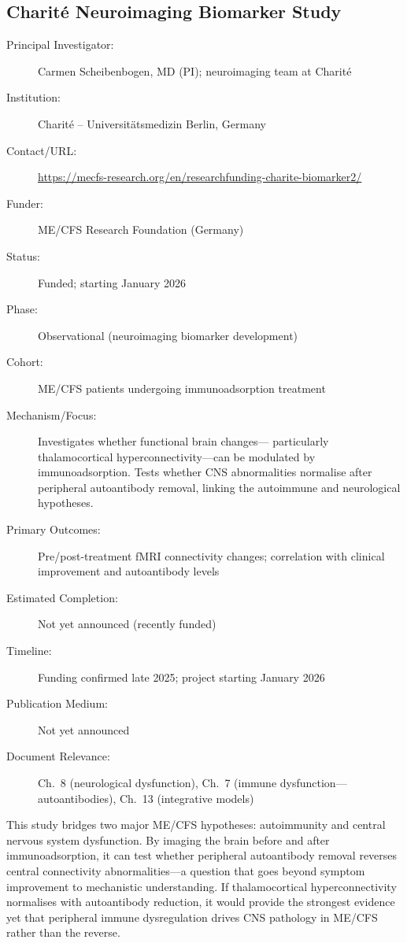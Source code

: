 \subsection{Charit\'{e} Neuroimaging Biomarker Study}
\label{sec:registry-charite-neuroimaging}

\begin{description}
    \item[Principal Investigator:] Carmen Scheibenbogen, MD (PI);
        neuroimaging team at Charit\'{e}
    \item[Institution:] Charit\'{e} -- Universit\"{a}tsmedizin Berlin, Germany
    \item[Contact/URL:] \url{https://mecfs-research.org/en/researchfunding-charite-biomarker2/}
    \item[Funder:] ME/CFS Research Foundation (Germany)
    \item[Status:] Funded; starting January 2026
    \item[Phase:] Observational (neuroimaging biomarker development)
    \item[Cohort:] ME/CFS patients undergoing immunoadsorption treatment
    \item[Mechanism/Focus:] Investigates whether functional brain changes---
        particularly thalamocortical hyperconnectivity---can be modulated by
        immunoadsorption.  Tests whether CNS abnormalities normalise after
        peripheral autoantibody removal, linking the autoimmune and
        neurological hypotheses.
    \item[Primary Outcomes:] Pre/post-treatment fMRI connectivity changes;
        correlation with clinical improvement and autoantibody levels
    \item[Estimated Completion:] Not yet announced (recently funded)
    \item[Timeline:] Funding confirmed late 2025; project starting
        January 2026
    \item[Publication Medium:] Not yet announced
    \item[Document Relevance:] Ch.~8 (neurological dysfunction), Ch.~7
        (immune dysfunction---autoantibodies), Ch.~13 (integrative models)
\end{description}

This study bridges two major ME/CFS hypotheses: autoimmunity and central
nervous system dysfunction.  By imaging the brain before and after
immunoadsorption, it can test whether peripheral autoantibody removal
reverses central connectivity abnormalities---a question that goes beyond
symptom improvement to mechanistic understanding.  If thalamocortical
hyperconnectivity normalises with autoantibody reduction, it would provide
the strongest evidence yet that peripheral immune dysregulation drives
CNS pathology in ME/CFS rather than the reverse.


